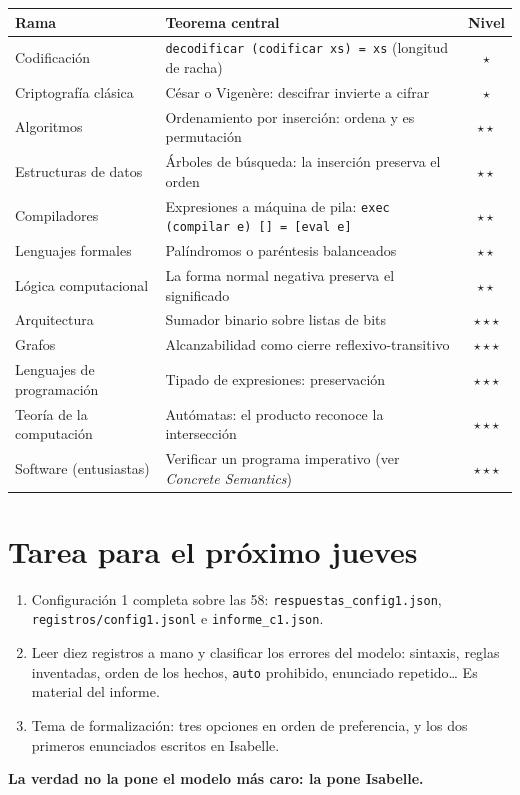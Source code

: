 \documentclass[11pt,a4paper]{article}
\newcommand{\cd}[1]{\texttt{\small #1}}
\begin{document}
\begin{center}
\small
\begin{tabularx}{\linewidth}{@{}>{\raggedright\arraybackslash}p{3.4cm}Xc@{}}
  \toprule
  Rama & Teorema central & Nivel \\
  \midrule
  Codificación & \cd{decodificar (codificar xs) = xs} (longitud de racha) & $\star$ \\
  Criptografía clásica & César o Vigenère: descifrar invierte a cifrar & $\star$ \\
  Algoritmos & Ordenamiento por inserción: ordena y es permutación & $\star\star$ \\
  Estructuras de datos & Árboles de búsqueda: la inserción preserva el orden & $\star\star$ \\
  Compiladores & Expresiones a máquina de pila: \cd{exec (compilar e) [] = [eval e]} & $\star\star$ \\
  Lenguajes formales & Palíndromos o paréntesis balanceados & $\star\star$ \\
  Lógica computacional & La forma normal negativa preserva el significado & $\star\star$ \\
  Arquitectura & Sumador binario sobre listas de bits & $\star\star\star$ \\
  Grafos & Alcanzabilidad como cierre reflexivo-transitivo & $\star\star\star$ \\
  Lenguajes de programación & Tipado de expresiones: preservación & $\star\star\star$ \\
  Teoría de la computación & Autómatas: el producto reconoce la intersección & $\star\star\star$ \\
  Software (entusiastas) & Verificar un programa imperativo (ver \emph{Concrete Semantics}) & $\star\star\star$ \\
  \bottomrule
\end{tabularx}
\end{center}

\section{Tarea para el próximo jueves}

\begin{haga}
\begin{enumerate}
  \item Configuración 1 completa sobre las 58: \cd{respuestas\_config1.json},
    \cd{registros/config1.jsonl} e \cd{informe\_c1.json}.
  \item Leer diez registros a mano y clasificar los errores del modelo:
    sintaxis, reglas inventadas, orden de los hechos, \cd{auto}
    prohibido, enunciado repetido\ldots{} Es material del informe.
  \item Tema de formalización: tres opciones en orden de preferencia, y
    los dos primeros enunciados escritos en Isabelle.
\end{enumerate}
\end{haga}

\begin{center}
  \large\color{resalte}\bfseries La verdad no la pone el modelo más caro: la pone Isabelle.
\end{center}
\end{document}
